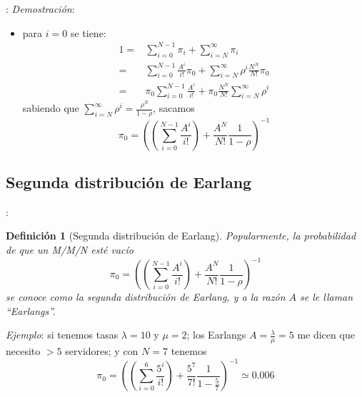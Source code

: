 \documentclass[xcolor={x11names}]{beamer}
\newtheorem{definicion}{Definición}[section]
\begin{document}
\begin{frame}{\secname: \subsecname}
    \textit{Demostración}:
    \begin{itemize}
        \item para $i=0$ se tiene:
            \begin{align*}
                1=&\sum_{i=0}^{N-1}\pi_i
                 + \sum_{i=N}^\infty \pi_i\\
                 =& \sum_{i=0}^{N-1}
                 \frac{A^i}{i!}\pi_0
                 + \sum_{i=N}^\infty
                 \rho^i \frac{N^N}{N!}\pi_0\\
                 =& \pi_0\sum_{i=0}^{N-1}
                 \frac{A^i}{i!}
                 + \pi_0 \frac{N^N}{N!}\sum_{i=N}^\infty
                 \rho^i
            \end{align*}
            sabiendo que
            $\sum_{i=N}^\infty
            \rho^i=\tfrac{\rho^N}{1-\rho}$,
            sacamos
            \begin{equation*}
            \pi_0=\left(
                \left(\sum_{i=0}^{N-1}
                \frac{A^i}{i!}
                \right)
                + \frac{A^N}{N!}\frac{1}{1-\rho}
            \right)^{-1}
            \end{equation*}
    \end{itemize}
\end{frame}



\subsection{Segunda distribución de Earlang}
\begin{frame}{\secname: \subsecname}
    \begin{definicion}[Segunda distribución de
        Earlang]
        Popularmente, la probabilidad de que
        un M/M/N esté vacío
                \begin{equation*}
                \pi_0=\left(
                    \left(\sum_{i=0}^{N-1}
                    \frac{A^i}{i!}
                    \right)
                    + \frac{A^N}{N!}\frac{1}{1-\rho}
                \right)^{-1}
                \end{equation*}
        se conoce como la segunda
        distribución de Earlang, y a la razón
        $A$ se le llaman ``Earlangs''.
    \end{definicion}

    \vfill

    \textit{Ejemplo}: si tenemos tasas
    $\lambda=10$ y $\mu=2$; los Earlangs
    $A=\tfrac{\lambda}{\mu}=5$ me dicen que
    necesito $>5$ servidores; y con $N=7$
    tenemos
    \begin{equation*}
    \pi_0=\left(
        \left(\sum_{i=0}^{6}
        \frac{5^i}{i!}
        \right)
        + \frac{5^7}{7!}\frac{1}{1-\tfrac{5}{7}}
    \right)^{-1}
    \simeq 0.006
    \end{equation*}
\end{frame}
\end{document}
